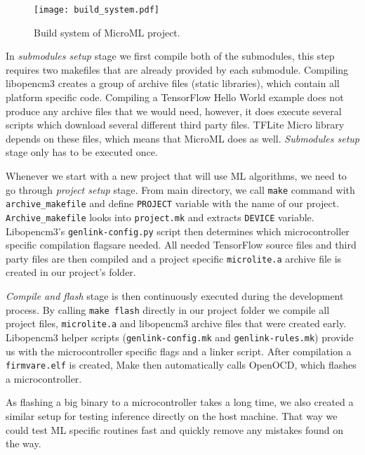 \begin{figure}[ht]
        \centering
        \texttt{[image: build\_system.pdf]} 
        \caption{ Build system of MicroML project.} 
        \label{build_system}
\end{figure}

In \textit{submodules setup} stage we first compile both of the submodules, this step requires two makefiles that are already provided by each submodule.
Compiling libopencm3 creates a group of archive files (static libraries), which contain all platform specific code.
Compiling a TensorFlow Hello World example does not produce any archive files that we would need, however, it does execute several scripts which download several different third party files.
TFLite Micro library depends on these files, which means that MicroML does as well.
\textit{Submodules setup} stage only has to be executed once.

Whenever we start with a new project that will use ML algorithms, we need to go through \textit{project setup} stage.
From main directory, we call \verb|make| command with \verb|archive_makefile| and define \verb|PROJECT| variable with the name of our project.
\verb|Archive_makefile| looks into \verb|project.mk| and extracts \verb|DEVICE| variable.
Libopencm3's \verb|genlink-config.py| script then determines which microcontroller specific compilation flags\footnotemark are needed. 
All needed TensorFlow source files and third party files are then compiled and a project specific \verb|microlite.a| archive file is created in our project's folder.

\textit{Compile and flash} stage is then continuously executed during the development process.
By calling \verb|make flash| directly in our project folder we compile all project files, \verb|microlite.a| and libopencm3 archive files that were created early.
Libopencm3 helper scripts (\verb|genlink-config.mk| and \verb|genlink-rules.mk|) provide us with the microcontroller specific flags and a linker script.
After compilation a \verb|firmvare.elf| is created, Make then automatically calls OpenOCD, which flashes a microcontroller.

As flashing a big binary to a microcontroller takes a long time, we also created a similar setup for testing inference directly on the host machine.
That way we could test ML specific routines fast and quickly remove any mistakes found on the way.


